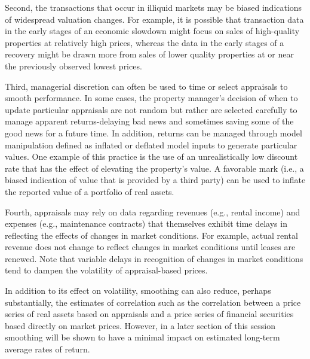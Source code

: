 \documentclass[11pt]{article}
\begin{document}
Second, the transactions that occur in illiquid markets may be biased indications of widespread valuation changes. For example, it is possible that transaction data in the early stages of an economic slowdown might focus on sales of high-quality properties at relatively high prices, whereas the data in the early stages of a recovery might be drawn more from sales of lower quality properties at or near the previously observed lowest prices.

Third, managerial discretion can often be used to time or select appraisals to smooth performance. In some cases, the property manager's decision of when to update particular appraisals are not random but rather are selected carefully to manage apparent returns-delaying bad news and sometimes saving some of the good news for a future time. In addition, returns can be managed through model manipulation defined as inflated or deflated model inputs to generate particular values. One example of this practice is the use of an unrealistically low discount rate that has the effect of elevating the property's value. A favorable mark (i.e., a biased indication of value that is provided by a third party) can be used to inflate the reported value of a portfolio of real assets.

Fourth, appraisals may rely on data regarding revenues (e.g., rental income) and expenses (e.g., maintenance contracts) that themselves exhibit time delays in reflecting the effects of changes in market conditions. For example, actual rental revenue does not change to reflect changes in market conditions until leases are renewed. Note that variable delays in recognition of changes in market conditions tend to dampen the volatility of appraisal-based prices.

In addition to its effect on volatility, smoothing can also reduce, perhaps substantially, the estimates of correlation such as the correlation between a price series of real assets based on appraisals and a price series of financial securities based directly on market prices. However, in a later section of this session smoothing will be shown to have a minimal impact on estimated long-term average rates of return.
\end{document}
